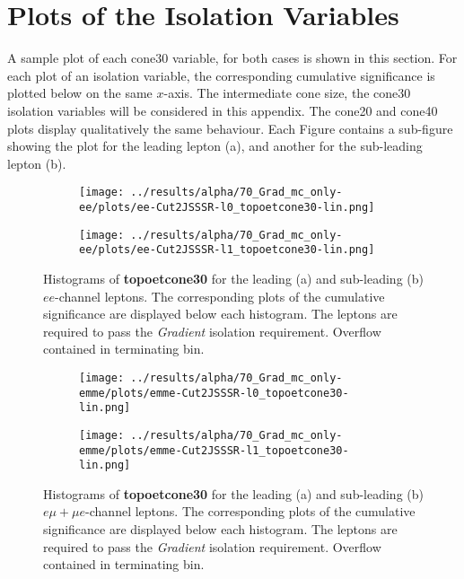 \chapter{Plots of the Isolation Variables}
\label{appendix2}
A sample plot of each cone30 variable, for both cases is shown in this section. For each plot of an isolation variable, the corresponding cumulative significance is plotted below on the same $x$-axis. The intermediate cone size, the cone30 isolation variables will be considered in this appendix. The cone20 and cone40 plots display qualitatively the same behaviour. Each Figure contains a sub-figure showing the plot for the leading lepton (a), and another for the sub-leading lepton (b).
\begin{figure}
\centering
\begin{subfigure}{.65\textwidth}
  \centering
  \texttt{[image: ../results/alpha/70\_Grad\_mc\_only-ee/plots/ee-Cut2JSSSR-l0\_topoetcone30-lin.png]}
  \caption{}
  \label{ee_eading_topoetcone}
\end{subfigure}
\begin{subfigure}{.65\textwidth}
 \centering
  \texttt{[image: ../results/alpha/70\_Grad\_mc\_only-ee/plots/ee-Cut2JSSSR-l1\_topoetcone30-lin.png]}
  \caption{}
  \label{ee_subleading_topoetcone}
\end{subfigure}
\caption{Histograms of \textbf{topoetcone30} for the leading (a) and sub-leading (b) $ee$-channel leptons. The corresponding plots of the cumulative significance are displayed below each histogram. The leptons are required to pass the \textit{Gradient} isolation requirement. Overflow contained in terminating bin.}
\label{topoetcone30_isoplots_wGrad_ee}
\end{figure}
\begin{figure}
\centering
\begin{subfigure}{.65\textwidth}
  \centering
  \texttt{[image: ../results/alpha/70\_Grad\_mc\_only-emme/plots/emme-Cut2JSSSR-l0\_topoetcone30-lin.png]}
  \caption{}
  \label{emme_leading_topoetcone}
\end{subfigure}
\begin{subfigure}{.65\textwidth}
 \centering
  \texttt{[image: ../results/alpha/70\_Grad\_mc\_only-emme/plots/emme-Cut2JSSSR-l1\_topoetcone30-lin.png]}
  \caption{}
  \label{emme_subleading_topoetcone}
\end{subfigure}
\caption{Histograms of \textbf{topoetcone30} for the leading (a) and sub-leading (b) $e\mu+\mu e$-channel leptons. The corresponding plots of the cumulative significance are displayed below each histogram. The leptons are required to pass the \textit{Gradient} isolation requirement. Overflow contained in terminating bin.}
\label{topoetcone30_isoplots_wGrad_emme}
\end{figure}
